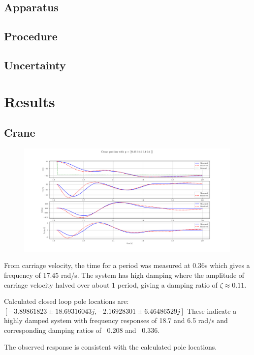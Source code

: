 \documentclass{article}
\begin{document}
\subsection{Apparatus}


\subsection{Procedure}


\subsection{Uncertainty}


\section{Results}

\subsection{Crane}

\begin{figure}[H]
  \centering
  \includegraphics[width=0.99\textwidth]{figures/3.3.png}
  \caption{}
  \label{fig:exp3.3}
\end{figure}

From carriage velocity, the time for a period was measured at 0.36s which gives a frequency of 17.45 rad/s.
The system has high damping where the amplitude of carriage velocity halved over about 1 period, giving a damping ratio of $\zeta \approx 0.11$.

Calculated closed loop pole locations are: $[-3.89861823 \pm 18.69316043j, -2.16928301 \pm 6.46486529j]$
These indicate a highly damped system with frequency responses of 18.7 and 6.5 rad/s and corresponding damping ratios of ~0.208 and ~0.336.

The observed response is consistent with the calculated pole locations.
\end{document}
